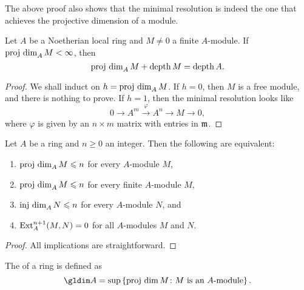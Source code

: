 \begin{remark}
    The above proof also shows that the minimal resolution is indeed the one that achieves the projective dimension of a module.
\end{remark}

\begin{theorem}
    Let $A$ be a Noetherian local ring and $M\ne 0$ a finite $A$-module. If $\operatorname{proj~dim}_A M < \infty$, then 
    \begin{equation*}
        \operatorname{proj~dim}_A M + \operatorname{depth} M = \operatorname{depth} A.
    \end{equation*}
\end{theorem}
\begin{proof}
    We shall induct on $h = \operatorname{proj~dim}_A M$. If $h = 0$, then $M$ is a free module, and there is nothing to prove. If $h = 1$, then the minimal resolution looks like 
    \begin{equation*}
        0\to A^m\xrightarrow{\varphi} A^n\to M\to 0,
    \end{equation*}
    where $\varphi$ is given by an $n\times m$ matrix with entries in $\mathfrak{m}$.
\end{proof}

\begin{lemma}
    Let $A$ be a ring and $n\ge 0$ an integer. Then the following are equivalent: 
    \begin{enumerate}[label=(\arabic*)]
        \item $\operatorname{proj~dim}_A M\leqslant n$ for every $A$-module $M$, 
        \item $\operatorname{proj~dim}_A M\leqslant n$ for every finite $A$-module $M$, 
        \item $\operatorname{inj~dim}_A N\leqslant n$ for every $A$-module $N$, and 
        \item $\operatorname{Ext}^{n + 1}_A(M, N) = 0$ for all $A$-modules $M$ and $N$.
    \end{enumerate}
\end{lemma}
\begin{proof}
    All implications are straightforward.
\end{proof}

\begin{definition}
    The  of a ring is defined as 
    \begin{equation*}
        \gldim A = \sup\left\{\projdim M\colon M\text{ is an $A$-module}\right\}.
    \end{equation*}
\end{definition}


